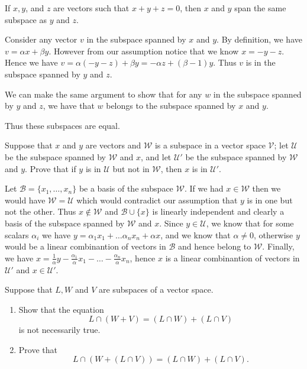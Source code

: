 \begin{problem}
  If $x, y$, and $z$ are vectors such that $x + y + z = 0$, then $x$ and $y$ span the same subspace as $y$ and $z$.
\end{problem}

\begin{solution}
  Consider any vector $v$ in the subspace spanned by $x$ and $y$.
  By definition, we have $v = \alpha x + \beta y$.
  However from our assumption notice that we know $x = - y - z$.
  Hence we have $v = \alpha (- y - z) + \beta y = - \alpha z + (\beta - 1) y$.
  Thus $v$ is in the subspace spanned by $y$ and $z$.

  We can make the same argument to show that for any $w$ in the subspace spanned by $y$ and $z$, we have that $w$ belongs to the subspace spanned by $x$ and $y$.

  Thus these subspaces are equal.
\end{solution}

\begin{problem}
  Suppose that $x$ and $y$ are vectors and $\mathcal{W}$ is a subspace in a vector space $\mathcal{V}$;
  let $\mathcal{U}$ be the subspace spanned by $\mathcal{W}$ and $x$, and let $\mathcal{U'}$ be the subspace spanned by $\mathcal{W}$ and $y$.
  Prove that if $y$ is in $\mathcal{U}$ but not in $\mathcal{W}$, then $x$ is in $\mathcal{U'}$.
\end{problem}

\begin{solution}
  Let $\mathcal{B} = \{x_1 , \ldots, x_n\}$ be a basis of the subspace $\mathcal{W}$.
  If we had $x \in \mathcal{W}$ then we would have $\mathcal{W} = \mathcal{U}$ which would contradict our assumption that $y$ is in one but not the other.
  Thus $x \notin \mathcal{W}$ and $\mathcal{B} \cup \{x\}$ is linearly independent and clearly a basis of the subspace spanned by $\mathcal{W}$ and $x$.
  Since $y \in \mathcal{U}$, we know that for some scalars $\alpha_i$ we have $y = \alpha_1 x_1 + \ldots \alpha_n x_n + \alpha x$, and we know that $\alpha \neq 0$, otherwise $y$ would be a linear combinantion of vectors in $\mathcal{B}$ and hence belong to $\mathcal{W}$.
  Finally, we have $x = \frac{1}{\alpha} y - \frac{\alpha_1}{\alpha} x_1 - \ldots - \frac{\alpha_n}{\alpha} x_n$, hence $x$ is a linear combinantion of vectors in $\mathcal{U'}$ and $x \in \mathcal{U'}$.
\end{solution}

\begin{problem}
  Suppose that $L, W$ and $V$ are subspaces of a vector space.
  \begin{enumerate}[label=(\alph*)]
    \item Show that the equation
      \[L \cap (W + V) = (L \cap W) + (L \cap V)\]
      is not necessarily true.
    \item Prove that
      \[L \cap (W + (L \cap V)) = (L \cap W) + (L \cap V).\]
  \end{enumerate}
\end{problem}

